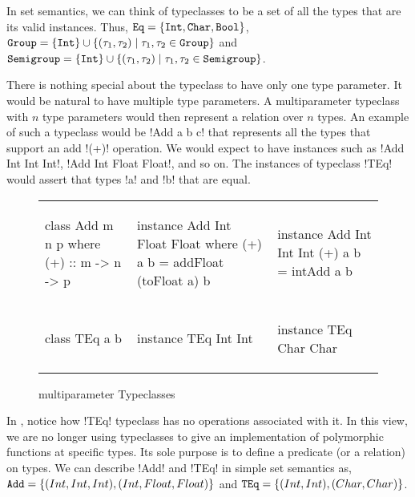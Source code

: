 \documentclass[format=sigplan,manuscript,review,screen,nonacm,margin=1in]{acmart}
\begin{document}
In set semantics, we can think of typeclasses to be a set of all the types that are its valid instances.
Thus, $\texttt{Eq} = \{\texttt{Int}, \texttt{Char},\texttt{Bool}\}$,
$\texttt{Group} = \{\texttt{Int}\} \cup \{(\tau_1, \tau_2) \mid \tau_1, \tau_2 \in \texttt{Group}\}$ and
$\texttt{Semigroup} = \{\texttt{Int}\} \cup \{(\tau_1, \tau_2) \mid \tau_1, \tau_2 \in \texttt{Semigroup}\}$.


There is nothing special about the typeclass to have only one type parameter.
It would be natural to have multiple type parameters. A multiparameter typeclass
with $n$ type parameters would then represent a relation over $n$ types.
An example of such a typeclass would be !Add a b c! that represents
all the types that support an add !(+)! operation. We would expect to have instances such as !Add Int Int Int!, 
!Add Int Float Float!, and so on. The instances of typeclass !TEq! would assert that types !a! and !b! that are equal.

\begin{figure}[ht]
  \begin{tabular}{l l l}
    \begin{code}
class Add m n p where
  (+) :: m -> n -> p
    \end{code}&%
    \begin{code}
instance Add Int Float Float where
  (+) a b = addFloat (toFloat a) b
    \end{code}&%
    \begin{code}
instance Add Int Int Int
  (+) a b = intAdd a b
    \end{code}\\
    \begin{code}
class TEq a b
    \end{code}&%
    \begin{code}
instance TEq Int Int
    \end{code}&%
    \begin{code}
instance TEq Char Char
    \end{code}
  \end{tabular}
  \caption{multiparameter Typeclasses}
  \label{fig:multip-typeclass}
\end{figure}
In , notice how !TEq! typeclass has no operations associated with it.
In this view, we are no longer using typeclasses to give an implementation of polymorphic
functions at specific types. Its sole purpose is to define a predicate (or a relation) on types. 
We can describe !Add! and !TEq! in simple set semantics as, $\texttt{Add} = \{(Int, Int, Int), (Int, Float, Float)\}$
and $\texttt{TEq} = \{(Int, Int),(Char, Char)\}$.
\end{document}

